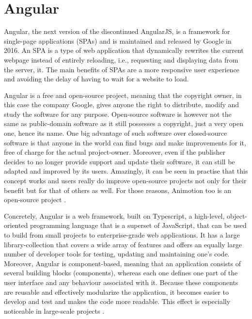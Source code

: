\section{Angular}
Angular, the next version of the discontinued AngularJS, is a framework for single-page applications (SPAs) and is maintained and released
by Google in 2016. An SPA is a type of web application that dynamically rewrites the current webpage instead of entirely reloading, i.e.,
requesting and displaying data from the server, it. The main benefits of SPAs are a more responsive user experience and avoiding the delay
of having to wait for a website to load. \cite{RoadToReact}

Angular is a free and open-source project, meaning that the copyright owner, in this case the company Google,
gives anyone the right to distribute, modify and study the software for any purpose. Open-source software is 
however not the same as public-domain software as it still possesses a copyright, just a very open one, hence its name. 
One big advantage of such software over closed-source software is that anyone in the world can find bugs and make 
improvements for it, free of charge for the actual project-owner. Moreover, even if the publisher decides to no longer 
provide support and update their software, it can still be adapted and improved by its users. Amazingly, it can be seen 
in practise that this concept works and users really do improve open-source projects not only for their benefit but for 
that of others as well. For those reasons, Animotion too is an open-source project \cite{Opensource}.

Concretely, Angular is a web framework, built on Typescript, a high-level, object-oriented programming language that is 
a superset of JavaScript, that can be used to build from small projects to enterprise-grade web applications. It has a 
large library-collection that covers a wide array of features and offers an equally large number of developer tools for 
testing, updating and maintaining one's code. Moreover, Angular is component-based, meaning that an application consists 
of several building blocks (components), whereas each one defines one part of the user interface and any behaviour associated 
with it. Because these components are reusable and effectively modularize the application, it becomes easier to develop and 
test and makes the code more readable. This effect is especially noticeable in large-scale projects \cite{AngularDescription}.

